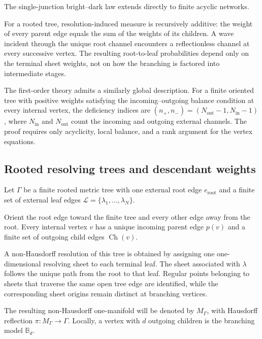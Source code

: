 \documentclass[11pt]{article}
\theoremstyle{plain}
\theoremstyle{definition}
\begin{document}
The single-junction bright--dark law extends directly to finite acyclic networks.

For a rooted tree, resolution-induced measure is recursively additive: the
weight of every parent edge equals the sum of the weights of its children.
A wave incident through the unique root channel encounters a
reflectionless channel at every successive vertex. The resulting
root-to-leaf probabilities depend only on the terminal sheet weights, not on
how the branching is factored into intermediate stages.

The first-order theory admits a similarly global description. For a finite
oriented tree with positive weights satisfying the incoming--outgoing balance
condition at every internal vertex, the deficiency indices are
\((n_+,n_-) = (N_{\mathrm{out}}-1,N_{\mathrm{in}}-1)\),
where \(N_{\mathrm{in}}\) and \(N_{\mathrm{out}}\) count the incoming and
outgoing external channels. The proof requires only acyclicity, local
balance, and a rank argument for the vertex equations.

\subsection{Rooted resolving trees and descendant weights}
\label{subsec:trees-rooted}
\label{subsec:trees-descendant-weights}
\label{subsec:trees-H1}

Let \(\Gamma\) be a finite rooted metric tree with one external root edge \(e_{\mathrm{root}}\) and a finite set of external leaf edges
\(\mathcal L = \{\lambda_1,\ldots,\lambda_N\}\).

Orient the root edge toward the finite tree and every other edge away from
the root. Every internal vertex \(v\) has a unique incoming parent edge \(p(v)\) and a finite set of outgoing child edges
\(\operatorname{Ch}(v)\).

A non-Hausdorff resolution of this tree is obtained by assigning one
one-dimensional resolving sheet to each terminal leaf. The sheet associated
with \(\lambda\) follows the unique path from the root to that leaf. Regular
points belonging to sheets that traverse the same open tree edge are
identified, while the corresponding sheet origins remain distinct at
branching vertices.

The resulting non-Hausdorff one-manifold will be denoted by
\(M_\Gamma\),
with Hausdorff reflection
\(\pi: M_\Gamma \longrightarrow \Gamma\).
Locally, a vertex with \(d\) outgoing children is the branching model
\(\mathbb B_d\).
\end{document}
